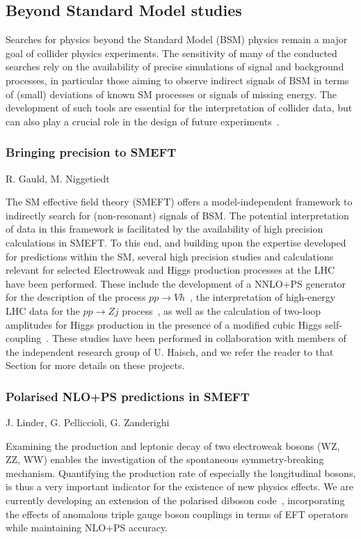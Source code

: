 \documentclass{FBR_Bericht_2025}
\begin{document}
\subsection{Beyond Standard Model studies}
\begin{refsection}
Searches for physics beyond the Standard Model (BSM) physics remain a major goal of collider physics experiments.
The sensitivity of many of the conducted searches rely on the availability of precise simulations of signal and background processes, in particular those aiming to observe indirect signals of BSM in terms of (small) deviations of known SM processes or signals of missing energy. 
The development of such tools are essential for the interpretation of collider data, but can also play a crucial role in the design of future experiments~\cite{Bechtle:2024atq}.
%
\subsubsection{Bringing precision to SMEFT}
\begin{Namen}
R. Gauld, M. Niggetiedt%
\end{Namen}
The SM effective field theory (SMEFT) offers a model-independent framework to indirectly search for (non-resonant) signals of BSM.
The potential interpretation of data in this framework is facilitated by the availability of high precision calculations in SMEFT.
To this end, and building upon the expertise developed for predictions within the SM, several high precision studies and calculations relevant for selected Electroweak and Higgs production processes at the LHC have been performed.
These include the development of a NNLO+PS generator for the description of the process $pp\to Vh$~\cite{Gauld:2023gtb}, the interpretation of high-energy LHC data for the $pp\to Zj$ process~\cite{Gauld:2024glt}, as well as the calculation of two-loop amplitudes for Higgs production in the presence of a modified cubic Higgs self-coupling~\cite{Haisch:2024nzv}.
These studies have been performed in collaboration with members of the independent research group of U. Haisch, and we refer the reader to that Section for more details on these projects.
%
\subsubsection{Polarised NLO+PS predictions in SMEFT}
\begin{Namen}
J. Linder, G. Pelliccioli, G. Zanderighi
\end{Namen}
%
Examining the production and leptonic decay of two electroweak bosons (WZ, ZZ, WW) enables the investigation of the spontaneous symmetry-breaking mechanism.
Quantifying the production rate of especially the longitudinal bosons, is thus a very important indicator for the existence of new physics effects.
We are currently developing an extension of the polarised diboson code~\cite{Pelliccioli:2023zpd}, incorporating the effects of anomalous triple gauge boson couplings in terms of EFT operators~\cite{Chiesa:2018lcs} while maintaining NLO+PS accuracy.
%

\end{refsection}
\end{document}
